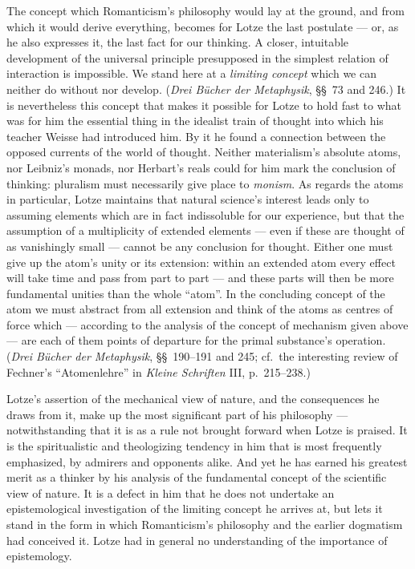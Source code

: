 \documentclass[12pt,a4paper]{book}
\newcommand{\opage}[1]{\marginnote{\footnotesize\textit{[#1]}}}
\begin{document}
The concept which Romanticism's philosophy would lay at the ground, and from
which it would derive everything, becomes for Lotze the last postulate --- or, as
he also expresses it, the last fact for our thinking. A closer, intuitable
development of the universal principle presupposed in the simplest relation of
interaction is impossible. We stand here at a \emph{limiting concept} which we
can neither do without nor develop. (\textit{Drei Bücher der Metaphysik},
§§~73 and 246.) It is nevertheless this concept that makes it possible for Lotze
to hold fast to what was for him the essential thing in the idealist train of
thought into which his teacher Weisse had introduced him. By it he found a
connection between the opposed currents of the world of thought. Neither
materialism's absolute atoms, nor Leibniz's monads, nor Herbart's reals could for
him mark the conclusion of thinking: pluralism must necessarily give place to
\emph{monism}. As regards the atoms in particular, Lotze maintains that natural
science's interest leads only to assuming elements which are in fact indissoluble
for our experience, but that the assumption of a multiplicity of extended
elements --- even if these are thought of as vanishingly small --- cannot be any
conclusion for thought. Either one must give up the atom's unity or its
extension: within an extended atom every effect will take time and pass from part
to part --- and these parts will then be more fundamental unities than the whole
``atom''. In the concluding concept of the atom we must abstract from all
extension and think of the atoms as centres of force which --- according to the
analysis of the concept of mechanism given above --- are each of them points of
departure for the primal substance's operation. (\textit{Drei Bücher der
Metaphysik}, §§~190--191 and 245; cf.\ the interesting review of Fechner's
``Atomenlehre'' in \textit{Kleine Schriften} III, p.~215--238.)

\opage{517}Lotze's assertion of the mechanical view of nature, and the consequences he draws
from it, make up the most significant part of his philosophy --- notwithstanding
that it is as a rule not brought forward when Lotze is praised. It is the
spiritualistic and theologizing tendency in him that is most frequently
emphasized, by admirers and opponents alike. And yet he has earned his greatest
merit as a thinker by his analysis of the fundamental concept of the scientific
view of nature. It is a defect in him that he does not undertake an
epistemological investigation of the limiting concept he arrives at, but lets it
stand in the form in which Romanticism's philosophy and the earlier dogmatism had
conceived it. Lotze had in general no understanding of the importance of
epistemology.
\end{document}
